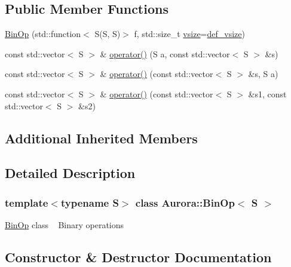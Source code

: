 \subsection*{Public Member Functions}
\begin{DoxyCompactItemize}
\item 
\hyperlink{class_aurora_1_1_bin_op_aa4d342b5e98bd21ba48d3c29500a9978}{Bin\+Op} (std\+::function$<$ S(S, S)$>$ f, std\+::size\+\_\+t \hyperlink{class_aurora_1_1_snd_base_ad68387541cc3d696d0cf58d474f94b73}{vsize}=\hyperlink{namespace_aurora_afaaddf667a06e7ce23c667a8b7295263}{def\+\_\+vsize})
\item 
const std\+::vector$<$ S $>$ \& \hyperlink{class_aurora_1_1_bin_op_aef7a0a9a5daa40c22e540f08ca928fab}{operator()} (S a, const std\+::vector$<$ S $>$ \&s)
\item 
const std\+::vector$<$ S $>$ \& \hyperlink{class_aurora_1_1_bin_op_a488095df0eb9f16da6643476dec9e51c}{operator()} (const std\+::vector$<$ S $>$ \&s, S a)
\item 
const std\+::vector$<$ S $>$ \& \hyperlink{class_aurora_1_1_bin_op_abe8a0b7666caeda012d9ac18f889e116}{operator()} (const std\+::vector$<$ S $>$ \&s1, const std\+::vector$<$ S $>$ \&s2)
\end{DoxyCompactItemize}
\subsection*{Additional Inherited Members}


\subsection{Detailed Description}
\subsubsection*{template$<$typename S$>$\newline
class Aurora\+::\+Bin\+Op$<$ S $>$}

\hyperlink{class_aurora_1_1_bin_op}{Bin\+Op} class ~\newline
Binary operations 

\subsection{Constructor \& Destructor Documentation}
\mbox{\label{class_aurora_1_1_bin_op_aa4d342b5e98bd21ba48d3c29500a9978}} 
